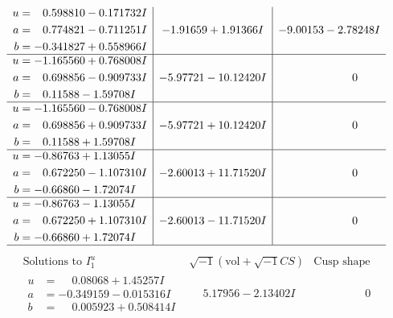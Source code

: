 \documentclass[1p]{elsarticle_modified}
\theoremstyle{definition}
\newcommand{\I}{\sqrt{-1}}
\begin{document}
$$\begin{array}{c|c|c}
\begin{aligned}
u &= \phantom{-}0.598810 - 0.171732 I \\
a &= \phantom{-}0.774821 - 0.711251 I \\
b &= -0.341827 + 0.558966 I\end{aligned}
 & -1.91659 + 1.91366 I & -9.00153 - 2.78248 I \\ \hline\begin{aligned}
u &= -1.165560 + 0.768008 I \\
a &= \phantom{-}0.698856 - 0.909733 I \\
b &= \phantom{-}0.11588 - 1.59708 I\end{aligned}
 & -5.97721 - 10.12420 I & \phantom{-0.000000 } 0 \\ \hline\begin{aligned}
u &= -1.165560 - 0.768008 I \\
a &= \phantom{-}0.698856 + 0.909733 I \\
b &= \phantom{-}0.11588 + 1.59708 I\end{aligned}
 & -5.97721 + 10.12420 I & \phantom{-0.000000 } 0 \\ \hline\begin{aligned}
u &= -0.86763 + 1.13055 I \\
a &= \phantom{-}0.672250 - 1.107310 I \\
b &= -0.66860 - 1.72074 I\end{aligned}
 & -2.60013 + 11.71520 I & \phantom{-0.000000 } 0 \\ \hline\begin{aligned}
u &= -0.86763 - 1.13055 I \\
a &= \phantom{-}0.672250 + 1.107310 I \\
b &= -0.66860 + 1.72074 I\end{aligned}
 & -2.60013 - 11.71520 I & \phantom{-0.000000 } 0\\
 \hline 
 \end{array}$$\newpage$$\begin{array}{c|c|c}  
\text{Solutions to }I^u_{1}& \I (\text{vol} + \sqrt{-1}CS) & \text{Cusp shape}\\
 \hline 
\begin{aligned}
u &= \phantom{-}0.08068 + 1.45257 I \\
a &= -0.349159 - 0.015316 I \\
b &= \phantom{-}0.005923 + 0.508414 I\end{aligned}
 & \phantom{-}5.17956 - 2.13402 I & \phantom{-0.000000 } 0 \\ \hline\begin{aligned}

\end{aligned}
\end{array}$$
\end{document}
